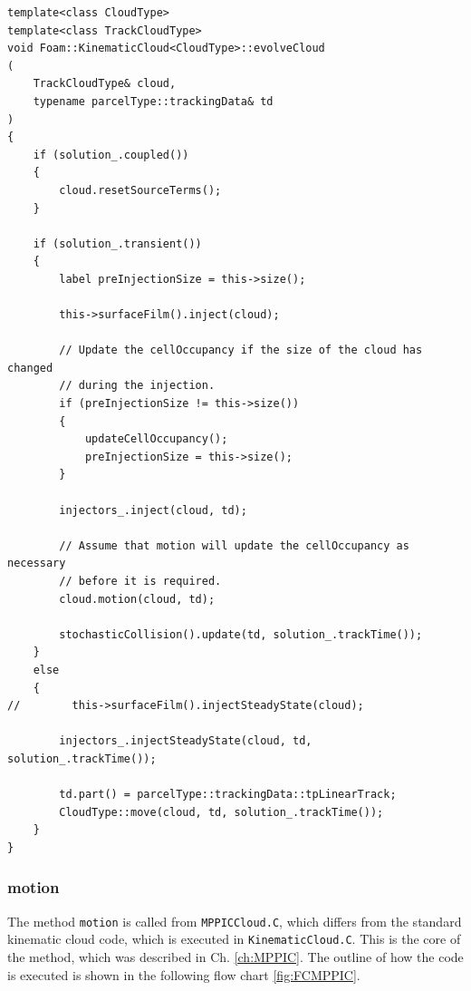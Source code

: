 \ifcode
\begin{lstlisting}[firstnumber=221,caption=from kinematicCloud.C, label ={code:evolveCloud}]
    template<class CloudType>
template<class TrackCloudType>
void Foam::KinematicCloud<CloudType>::evolveCloud
(
    TrackCloudType& cloud,
    typename parcelType::trackingData& td
)
{
    if (solution_.coupled())
    {
        cloud.resetSourceTerms();
    }

    if (solution_.transient())
    {
        label preInjectionSize = this->size();

        this->surfaceFilm().inject(cloud);

        // Update the cellOccupancy if the size of the cloud has changed
        // during the injection.
        if (preInjectionSize != this->size())
        {
            updateCellOccupancy();
            preInjectionSize = this->size();
        }

        injectors_.inject(cloud, td);

        // Assume that motion will update the cellOccupancy as necessary
        // before it is required.
        cloud.motion(cloud, td);

        stochasticCollision().update(td, solution_.trackTime());
    }
    else
    {
//        this->surfaceFilm().injectSteadyState(cloud);

        injectors_.injectSteadyState(cloud, td, solution_.trackTime());

        td.part() = parcelType::trackingData::tpLinearTrack;
        CloudType::move(cloud, td, solution_.trackTime());
    }
}

\end{lstlisting}
\fi




\subsubsection{motion}
\label{sec:MPLoop}
The method \lstinline|motion| is called from \lstinline|MPPICCloud.C|, which differs from the standard kinematic cloud code, which is executed in \lstinline|KinematicCloud.C|. This is the core of the \MP method, which was described in Ch. \ref{ch:MPPIC}. 
The outline of how the code is executed is shown in the following flow chart \ref{fig:FCMPPIC}.


